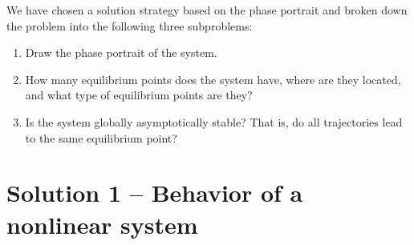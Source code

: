 \documentclass[a4paper]{article} %
\begin{document}
We have chosen a solution strategy based on the phase portrait and broken down the problem into the following three subproblems:
\begin{enumerate}
  \item Draw the phase portrait of the system.
  \item How many equilibrium points does the system have, where are they located, and what type of equilibrium points are they?
  \item Is the system globally asymptotically stable?  That is, do all trajectories lead to the same equilibrium point?
\end{enumerate}

\section*{Solution 1 -- Behavior of a nonlinear system}
\label{sec:sol1}
\end{document}
